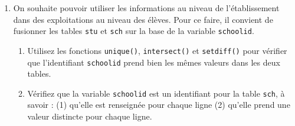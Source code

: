 \documentclass[12pt,twosided, notitlepage]{book}
\newenvironment{Shaded}{}{}
\newcommand{\KeywordTok}[1]{\textcolor[rgb]{0.00,0.00,1.00}{{#1}}}
\newcommand{\CommentTok}[1]{\textcolor[rgb]{0.00,0.50,0.00}{{#1}}}
\newcommand{\NormalTok}[1]{{#1}}
\newif \ifsol
\renewenvironment{Shaded}{\begin{snugshade}}{\end{snugshade}}
\begin{document}
\begin{enumerate}
  \bigskip  \fi 
\item
  On souhaite pouvoir utiliser les informations au niveau de
  l'établissement dans des exploitations au niveau des élèves. Pour ce
  faire, il convient de fusionner les tables \texttt{stu} et
  \texttt{sch} sur la base de la variable \texttt{schoolid}.

  \begin{enumerate}
  \def\labelenumii{\roman{enumii}.}
  \item
    Utilisez les fonctions \texttt{unique()},
    \texttt{intersect()} et
    \texttt{setdiff()} pour vérifier que
    l'identifiant \texttt{schoolid} prend bien les mêmes valeurs dans
    les deux tables.

    \ifsol 

    \begin{center} \rule{0.5\linewidth}{\linethickness}\end{center}

\begin{Shaded}
\begin{Highlighting}[]
\KeywordTok{length}\NormalTok{(}\KeywordTok{intersect}\NormalTok{(stu$schoolid, sch$schoolid))}
  \NormalTok{## [1] 226}
\KeywordTok{length}\NormalTok{(}\KeywordTok{unique}\NormalTok{(stu$schoolid))}
  \NormalTok{## [1] 226}
\KeywordTok{length}\NormalTok{(}\KeywordTok{unique}\NormalTok{(sch$schoolid))}
  \NormalTok{## [1] 226}

\CommentTok{# Cela fonctionne aussi plus finement avec setdiff()}
\KeywordTok{setdiff}\NormalTok{(stu$schoolid, sch$schoolid)}
  \NormalTok{## character(0)}
\CommentTok{# Aucune valeur de stu$schoolid n'est pas dans sch$schoolid}
\KeywordTok{setdiff}\NormalTok{(sch$schoolid, stu$schoolid)}
  \NormalTok{## character(0)}
\CommentTok{# Aucune valeur de sch$schoolid n'est pas dans stu$schoolid}
\end{Highlighting}
\end{Shaded}

    \begin{center} \rule{0.5\linewidth}{\linethickness}\end{center}

    \bigskip  \fi 
  \item
    Vérifiez que la variable \texttt{schoolid} est un identifiant pour
    la table \texttt{sch}, à savoir : (1) qu'elle est renseignée pour
    chaque ligne (2) qu'elle prend une valeur distincte pour chaque
    ligne.


\end{enumerate}
\end{enumerate}
\end{document}
